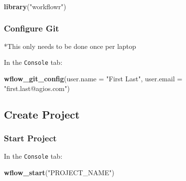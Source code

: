 \documentclass[]{book}
\newenvironment{Shaded}{\begin{snugshade}}{\end{snugshade}}
\newcommand{\DataTypeTok}[1]{\textcolor[rgb]{0.13,0.29,0.53}{#1}}
\newcommand{\KeywordTok}[1]{\textcolor[rgb]{0.13,0.29,0.53}{\textbf{#1}}}
\newcommand{\NormalTok}[1]{#1}
\newcommand{\StringTok}[1]{\textcolor[rgb]{0.31,0.60,0.02}{#1}}
\begin{document}
\begin{Shaded}
\begin{Highlighting}[]
\KeywordTok{library}\NormalTok{(}\StringTok{"workflowr"}\NormalTok{)}
\end{Highlighting}
\end{Shaded}

\hypertarget{configure-git}{%
\subsubsection{Configure Git}\label{configure-git}}

*This only needs to be done once per laptop

In the \texttt{Console} tab:

\begin{Shaded}
\begin{Highlighting}[]
\KeywordTok{wflow_git_config}\NormalTok{(}\DataTypeTok{user.name =} \StringTok{"First Last"}\NormalTok{, }\DataTypeTok{user.email =} \StringTok{"first.last@agios.com"}\NormalTok{)}
\end{Highlighting}
\end{Shaded}

\hypertarget{create-project}{%
\subsection{Create Project}\label{create-project}}

\hypertarget{start-project}{%
\subsubsection{Start Project}\label{start-project}}

In the \texttt{Console} tab:

\begin{Shaded}
\begin{Highlighting}[]
\KeywordTok{wflow_start}\NormalTok{(}\StringTok{"PROJECT_NAME"}\NormalTok{)}
\end{Highlighting}
\end{Shaded}
\end{document}
